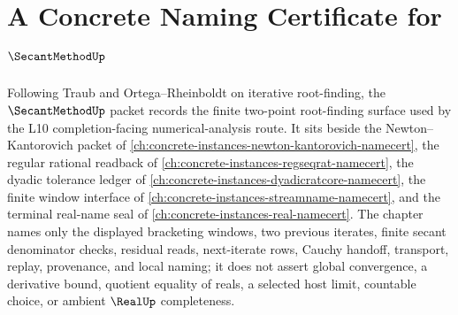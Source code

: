 \chapter{A Concrete Naming Certificate for $\SecantMethodUp$}
\label{ch:concrete-instances-secant-method-namecert}

Following Traub and Ortega--Rheinboldt on iterative root-finding, the $\SecantMethodUp$ packet records the finite two-point root-finding surface used by the L10 completion-facing numerical-analysis route. It sits beside the Newton--Kantorovich packet of \autoref{ch:concrete-instances-newton-kantorovich-namecert}, the regular rational readback of \autoref{ch:concrete-instances-regseqrat-namecert}, the dyadic tolerance ledger of \autoref{ch:concrete-instances-dyadicratcore-namecert}, the finite window interface of \autoref{ch:concrete-instances-streamname-namecert}, and the terminal real-name seal of \autoref{ch:concrete-instances-real-namecert}. The chapter names only the displayed bracketing windows, two previous iterates, finite secant denominator checks, residual reads, next-iterate rows, Cauchy handoff, transport, replay, provenance, and local naming; it does not assert global convergence, a derivative bound, quotient equality of reals, a selected host limit, countable choice, or ambient $\RealUp$ completeness.

